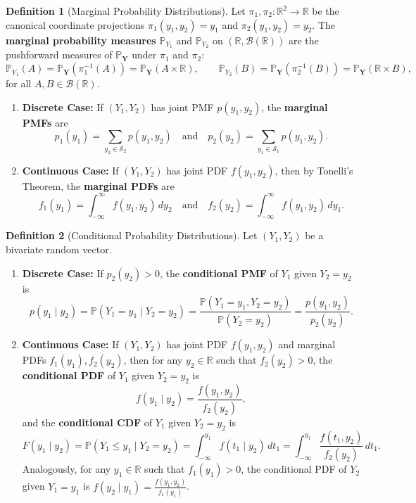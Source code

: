 \documentclass[11pt, letterpaper]{article}
\theoremstyle{definition}
\newtheorem{definition}{Definition}[section]
\theoremstyle{remark}
\newcommand{\Prob}{\mathbb{P}}
\begin{document}
\begin{definition}[Marginal Probability Distributions]
Let $\pi_1, \pi_2 : \mathbb{R}^2 \to \mathbb{R}$ be the canonical coordinate projections $\pi_1(y_1, y_2) = y_1$ and $\pi_2(y_1, y_2) = y_2$. The \textbf{marginal probability measures} $\Prob_{Y_1}$ and $\Prob_{Y_2}$ on $(\mathbb{R}, \mathcal{B}(\mathbb{R}))$ are the pushforward measures of $\Prob_{\mathbf{Y}}$ under $\pi_1$ and $\pi_2$:
\[ \Prob_{Y_1}(A) = \Prob_{\mathbf{Y}}(\pi_1^{-1}(A)) = \Prob_{\mathbf{Y}}(A \times \mathbb{R}), \qquad \Prob_{Y_2}(B) = \Prob_{\mathbf{Y}}(\pi_2^{-1}(B)) = \Prob_{\mathbf{Y}}(\mathbb{R} \times B), \]
for all $A, B \in \mathcal{B}(\mathbb{R})$.
\begin{enumerate}[label=(\alph*)]
    \item \textbf{Discrete Case:} If $(Y_1, Y_2)$ has joint PMF $p(y_1, y_2)$, the \textbf{marginal PMFs} are
    \[ p_1(y_1) = \sum_{y_2 \in \mathcal{S}_2} p(y_1, y_2) \quad \text{and} \quad p_2(y_2) = \sum_{y_1 \in \mathcal{S}_1} p(y_1, y_2). \]
    \item \textbf{Continuous Case:} If $(Y_1, Y_2)$ has joint PDF $f(y_1, y_2)$, then by Tonelli's Theorem, the \textbf{marginal PDFs} are
    \[ f_1(y_1) = \int_{-\infty}^\infty f(y_1, y_2) \, dy_2 \quad \text{and} \quad f_2(y_2) = \int_{-\infty}^\infty f(y_1, y_2) \, dy_1. \]
\end{enumerate}
\end{definition}

\begin{definition}[Conditional Probability Distributions]
Let $(Y_1, Y_2)$ be a bivariate random vector.
\begin{enumerate}[label=(\alph*)]
    \item \textbf{Discrete Case:} If $p_2(y_2) > 0$, the \textbf{conditional PMF} of $Y_1$ given $Y_2 = y_2$ is
    \[ p(y_1 \mid y_2) = \Prob(Y_1 = y_1 \mid Y_2 = y_2) = \frac{\Prob(Y_1 = y_1, Y_2 = y_2)}{\Prob(Y_2 = y_2)} = \frac{p(y_1, y_2)}{p_2(y_2)}. \]
    \item \textbf{Continuous Case:} If $(Y_1, Y_2)$ has joint PDF $f(y_1, y_2)$ and marginal PDFs $f_1(y_1), f_2(y_2)$, then for any $y_2 \in \mathbb{R}$ such that $f_2(y_2) > 0$, the \textbf{conditional PDF} of $Y_1$ given $Y_2 = y_2$ is
    \[ f(y_1 \mid y_2) = \frac{f(y_1, y_2)}{f_2(y_2)}, \]
    and the \textbf{conditional CDF} of $Y_1$ given $Y_2 = y_2$ is
    \[ F(y_1 \mid y_2) = \Prob(Y_1 \le y_1 \mid Y_2 = y_2) = \int_{-\infty}^{y_1} f(t_1 \mid y_2) \, dt_1 = \int_{-\infty}^{y_1} \frac{f(t_1, y_2)}{f_2(y_2)} \, dt_1. \]
    Analogously, for any $y_1 \in \mathbb{R}$ such that $f_1(y_1) > 0$, the conditional PDF of $Y_2$ given $Y_1 = y_1$ is $f(y_2 \mid y_1) = \frac{f(y_1, y_2)}{f_1(y_1)}$.
\end{enumerate}
\end{definition}
\end{document}
